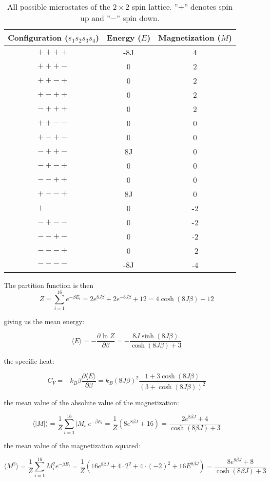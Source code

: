 \documentclass[english, 12pt]{article}
\newcommand{\f}{\frac}
\renewcommand{\dd}{\partial}
\begin{document}
\begin{table}[hbt!]
\centering
\begin{tabular}{|c|c|c|}
 Configuration ($s_1s_2s_3s_4$) & Energy ($E$) & Magnetization ($M$) \\ \hline
$++++$ & -8J & 4 \\
$+++-$ & 0 & 2 \\
$++-+$ & 0 & 2 \\
$+-++$ & 0 & 2 \\
$-+++$ & 0 & 2 \\
$++--$ & 0 & 0 \\
$+-+-$ & 0 & 0 \\
$-++-$ & 8J & 0 \\
$-+-+$ & 0 & 0 \\
$--++$ & 0 & 0 \\
$+--+$ & 8J & 0 \\
$+---$ & 0 & -2 \\
$-+--$ & 0 & -2 \\
$--+-$ & 0 & -2 \\
$---+$ & 0 & -2 \\
$----$ & -8J & -4 \\
\end{tabular}
\caption{All possible microstates of the $2\times2$ spin lattice. ''$+$'' denotes spin up and ''$-$'' spin down.}
\end{table}

The partition function is then 
$$Z = \sum\limits_{i=1}^{16}e^{-\beta E_i} = 2e^{8J\beta} +2e^{-8J\beta}+12
= 4\cosh(8J\beta) +12$$

giving us the mean energy:

$$\langle E\rangle = -\f{\dd \ln Z}{\dd\beta} = -\f{8J\sinh(8J\beta)}{\cosh(8J\beta) + 3}$$

the specific heat:

$$C_V = -k_B\beta\f{\dd\langle E\rangle}{\dd\beta} = k_B(8J\beta)^2\f{1+3\cosh(8J\beta)}{(3+\cosh(8J\beta))^2}$$

the mean value of the absolute value of the magnetization:

$$\langle|M|\rangle = \f{1}{Z}\sum\limits_{i=1}^{16}|M_i|e^{-\beta E_i} = \f{1}{Z}\left(8e^{8\beta J}+16\right) = \f{2e^{8\beta J}+4}{\cosh(8\beta J)+3}$$

the mean value of the magnetization squared:

$$\langle M ^2\rangle = \f{1}{Z}\sum\limits_{i=1}^{16}M_i^2e^{-\beta E_i} = \f{1}{Z} \left(16e^{8\beta J} + 4\cdot 2^2+4\cdot(-2)^2+16E^{8\beta J}\right) = \f{8e^{8\beta J} + 8}{\cosh(8\beta J) + 3}$$
\end{document}
